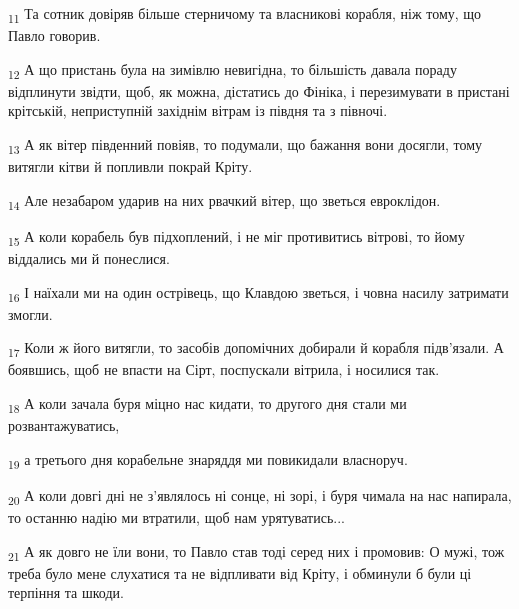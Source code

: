 \begin{tcolorbox}
\textsubscript{11} Та сотник довіряв більше стерничому та власникові корабля, ніж тому, що Павло говорив.
\end{tcolorbox}
\begin{tcolorbox}
\textsubscript{12} А що пристань була на зимівлю невигідна, то більшість давала пораду відплинути звідти, щоб, як можна, дістатись до Фініка, і перезимувати в пристані крітській, неприступній західнім вітрам із півдня та з півночі.
\end{tcolorbox}
\begin{tcolorbox}
\textsubscript{13} А як вітер південний повіяв, то подумали, що бажання вони досягли, тому витягли кітви й попливли покрай Кріту.
\end{tcolorbox}
\begin{tcolorbox}
\textsubscript{14} Але незабаром ударив на них рвачкий вітер, що зветься евроклідон.
\end{tcolorbox}
\begin{tcolorbox}
\textsubscript{15} А коли корабель був підхоплений, і не міг противитись вітрові, то йому віддались ми й понеслися.
\end{tcolorbox}
\begin{tcolorbox}
\textsubscript{16} І наїхали ми на один острівець, що Клавдою зветься, і човна насилу затримати змогли.
\end{tcolorbox}
\begin{tcolorbox}
\textsubscript{17} Коли ж його витягли, то засобів допомічних добирали й корабля підв'язали. А боявшись, щоб не впасти на Сірт, поспускали вітрила, і носилися так.
\end{tcolorbox}
\begin{tcolorbox}
\textsubscript{18} А коли зачала буря міцно нас кидати, то другого дня стали ми розвантажуватись,
\end{tcolorbox}
\begin{tcolorbox}
\textsubscript{19} а третього дня корабельне знаряддя ми повикидали власноруч.
\end{tcolorbox}
\begin{tcolorbox}
\textsubscript{20} А коли довгі дні не з'являлось ні сонце, ні зорі, і буря чимала на нас напирала, то останню надію ми втратили, щоб нам урятуватись...
\end{tcolorbox}
\begin{tcolorbox}
\textsubscript{21} А як довго не їли вони, то Павло став тоді серед них і промовив: О мужі, тож треба було мене слухатися та не відпливати від Кріту, і обминули б були ці терпіння та шкоди.
\end{tcolorbox}
